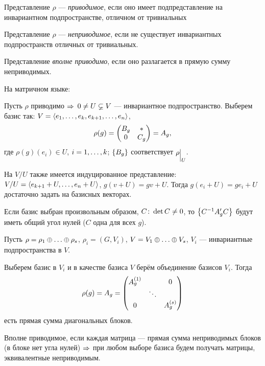 \begin{df}
	Представление $\rho$ --- \textit{приводимое}, если оно имеет
	подпредставление на инвариантном подпространстве,
	отличном от тривиальных
\end{df}
\begin{df}
	Представление $\rho$ --- \textit{неприводимое}, если не существует
	инвариантных подпространств отличных от тривиальных.
\end{df}
\begin{df}
	Представление \textit{вполне приводимо}, если оно разлагается в прямую сумму неприводимых.
\end{df}

На матричном языке:

Пусть $\rho$ приводимо $\Rightarrow$
$0 \ne U \varsubsetneq V$ --- инвариантное подпространство.
Выберем базис так: $V = \left\langle e_1 ,\ldots, e_k, e_{k + 1} ,\ldots, e_n\right\rangle$,
$$
	\rho(g) = \begin{pmatrix}B_g & * \\ 0 & C_g\end{pmatrix} = A_g,
$$
где $\rho(g)(e_i) \in U$, $i = 1 ,\ldots, k$;
$\left\{B_g\right\}$ соответствует $\rho\evn{U}$.

На $V/U$ также имеется индуцированное представление:
$V/U = \left\langle e_{k+1} + U ,\ldots, e_n + U\right\rangle$, $g(v + U) = gv + U$.
Тогда $g(e_i + U) = g e_i + U$ достаточно задать на базисных векторах.

Если базис выбран произвольным образом, $C \colon \det C \ne 0$,
то $\left\{C^{-1} A'_g C\right\}$ будут иметь общий угол нулей ($C$ одна для всех $g$).

Пусть $\rho = \rho_1 \sop \rho_s$, $\rho_i = (G, V_i)$, $V = V_1 \sop V_s$,
$V_i$ --- инвариантные подпространства в $V$.

Выберем базис в $V_i$ и в качестве базиса $V$ берём объединение базисов $V_i$.
Тогда
$$
	\rho(g) = A_g = \begin{pmatrix}A^{(1)}_g && 0 \\ & \ddots & \\ 0 && A^{(s)}_g\end{pmatrix}
$$
есть прямая сумма диагональных блоков.

Вполне приводимое, если каждая матрица ---
прямая сумма неприводимых блоков (в блоке нет угла нулей) $\Rightarrow$
при любом выборе базиса будем получать матрицы, эквивалентные неприводимым.

